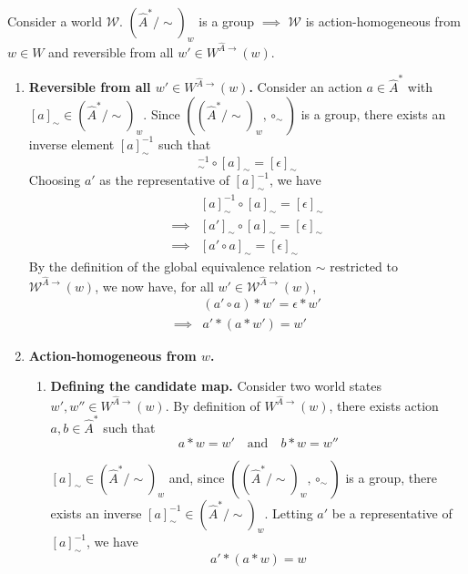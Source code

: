 \begin{propositionE}[][normal]
    Consider a world $\mathscr{W}$.
    $(\hat{A}^{*}/\sim)_{w}$ is a group $\implies$ $\mathscr{W}$ is action-homogeneous from $w \in W$ and reversible from all $w' \in W^{\hat{A}\to}(w)$.
\end{propositionE}
\begin{proofE}
\begin{enumerate}
    \item \textbf{Reversible from all $w' \in W^{\hat{A}\to}(w)$.}
    Consider an action $a \in \hat{A}^{*}$ with $[a]_{\sim} \in (\hat{A}^{*}/\sim)_{w}$.
    Since $((\hat{A}^{*}/\sim)_{w}, \circ_{\sim})$ is a group, there exists an inverse element $[a]^{-1}_{\sim}$ such that
    \begin{equation}
        [a]^{-1}_{\sim} \circ [a]_{\sim} = [\epsilon]_{\sim}
    \end{equation}
    Choosing $a'$ as the representative of $[a]^{-1}_{\sim}$, we have
    \begin{align}
        & [a]^{-1}_{\sim} \circ [a]_{\sim} = [\epsilon]_{\sim} \\
        \implies & [a']_{\sim} \circ [a]_{\sim} = [\epsilon]_{\sim} \\
        \implies & [a' \circ a]_{\sim} = [\epsilon]_{\sim}
    \end{align}
    By the definition of the global equivalence relation $\sim$ restricted to $\mathscr{W}^{\hat{A}\to}(w)$, we now have, for all $w' \in \mathscr{W}^{\hat{A}\to}(w)$,
    \begin{align}
        & (a' \circ a) \ast w' = \epsilon \ast w' \\
        \implies & a' \ast (a \ast w') = w'
    \end{align}

    \item \textbf{Action-homogeneous from $w$.}
    \begin{enumerate}
        \item \textbf{Defining the candidate map.}
        Consider two world states $w', w'' \in W^{\hat{A}\to}(w)$.
        By definition of $W^{\hat{A}\to}(w)$, there exists action $a, b \in \hat{A}^{*}$ such that
        \begin{equation}
            a \ast w = w' \quad \text{and} \quad b \ast w = w''
        \end{equation}
    
        $[a]_{\sim} \in (\hat{A}^{*}/\sim)_{w}$ and, since $((\hat{A}^{*}/\sim)_{w}, \circ_{\sim})$ is a group, there exists an inverse $[a]^{-1}_{\sim} \in (\hat{A}^{*}/\sim)_{w}$.
        Letting $a'$ be a representative of $[a]^{-1}_{\sim}$, we have
        \begin{equation}
            a' \ast (a \ast w) = w
        \end{equation}
    

\end{enumerate}
\end{enumerate}
\end{proofE}
